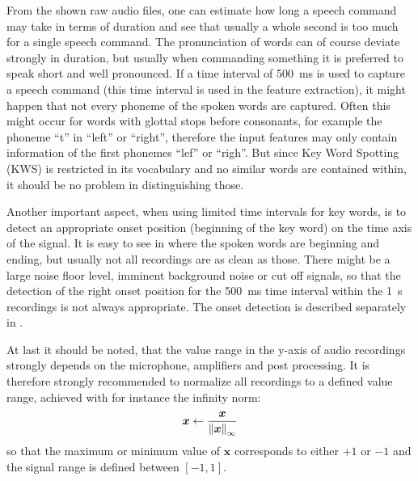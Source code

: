 From the shown raw audio files, one can estimate how long a speech command may take in terms of duration and see that usually a whole second is too much for a single speech command.
The pronunciation of words can of course deviate strongly in duration, but usually when commanding something it is preferred to speak short and well pronounced.
If a time interval of \SI{500}{\milli\second} is used to capture a speech command (this time interval is used in the feature extraction), it might happen that not every phoneme of the spoken words are captured. 
Often this might occur for words with glottal stops before consonants, for example the phoneme \enquote{t} in \enquote{left} or \enquote{right}, therefore the input features may only contain information of the first phonemes \enquote{lef} or \enquote{righ}.
But since Key Word Spotting (KWS) is restricted in its vocabulary and no similar words are contained within, it should be no problem in distinguishing those.

Another important aspect, when using limited time intervals for key words, is to detect an appropriate onset position (beginning of the key word) on the time axis of the signal.
It is easy to see in  where the spoken words are beginning and ending, but usually not all recordings are as clean as those.
There might be a large noise floor level, imminent background noise or cut off signals, so that the detection of the right onset position for the \SI{500}{\milli\second} time interval within the \SI{1}{\second} recordings is not always appropriate.
The onset detection is described separately in .

At last it should be noted, that the value range in the y-axis of audio recordings strongly depends on the microphone, amplifiers and post processing.
It is therefore strongly recommended to normalize all recordings to a defined value range, achieved with for instance the infinity norm:
\begin{equation}
  \bm{x} \gets \frac{\bm{x}}{\norm{\bm{x}}_\infty}
\end{equation}
so that the maximum or minimum value of $\bm{x}$ corresponds to either $+1$ or $-1$ and the signal range is defined between $[-1, 1]$.